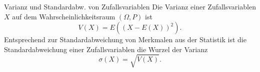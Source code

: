 \begin{definition}{Varianz und Standardabw. von Zufallsvariablen}
	Die Varianz einer Zufallsvariablen $X$ auf dem Wahrscheinlichkeitsraum $(\Omega,P)$ ist
	\begin{equation*}
		V(X)=E((X-E(X))^2).
	\end{equation*}
	Entsprechend zur Standardabweichung von Merkmalen aus der Statistik ist die Standardabweichung einer Zufallsvariablen die Wurzel der Varianz
	\begin{equation*}
		\sigma(X)=\sqrt{V(X)}.
	\end{equation*}
\end{definition}





